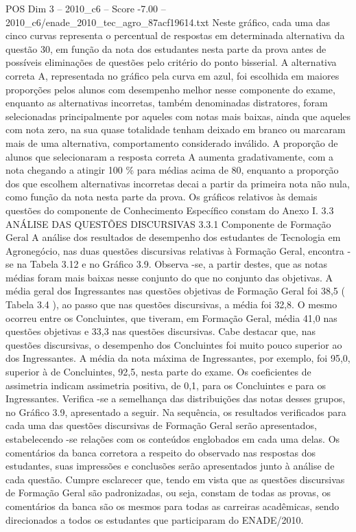 \begin{textsample}{POS Dim 3 – 2010\_c6 – Score -7.00 – 2010\_c6/enade\_2010\_tec\_agro\_87acf19614.txt}
Neste gráfico, cada uma das cinco curvas representa o percentual de respostas em determinada alternativa da questão 30, em função da nota dos estudantes nesta parte da prova antes de possíveis eliminações de questões pelo critério do ponto bisserial.
A alternativa correta A, representada no gráfico pela curva em azul, foi escolhida em maiores proporções pelos alunos com desempenho melhor nesse componente do exame, enquanto as alternativas incorretas, também denominadas distratores, foram selecionadas principalmente por aqueles com notas mais baixas, ainda que aqueles com nota zero, na sua quase totalidade tenham deixado em branco ou marcaram mais de uma alternativa, comportamento considerado inválido.
A proporção de alunos que selecionaram a resposta correta A aumenta gradativamente, com a nota chegando a atingir 100 \% para médias acima de 80, enquanto a proporção dos que escolhem alternativas incorretas decai a partir da primeira nota não nula, como função da nota nesta parte da prova.
Os gráficos relativos às demais questões do componente de Conhecimento Específico constam do Anexo I. 3.3 ANÁLISE DAS QUESTÕES DISCURSIVAS 3.3.1 Componente de Formação Geral A análise dos resultados de desempenho dos estudantes de Tecnologia em Agronegócio, nas duas questões discursivas relativas à Formação Geral, encontra -se na Tabela 3.12 e no Gráfico 3.9.
Observa -se, a partir destes, que as notas médias foram mais baixas nesse conjunto do que no conjunto das objetivas.
A média geral dos Ingressantes nas questões objetivas de Formação Geral foi 38,5 ( Tabela 3.4 ), ao passo que nas questões discursivas, a média foi 32,8.
O mesmo ocorreu entre os Concluintes, que tiveram, em Formação Geral, média 41,0 nas questões objetivas e 33,3 nas questões discursivas.
Cabe destacar que, nas questões discursivas, o desempenho dos Concluintes foi muito pouco superior ao dos Ingressantes.
A média da nota máxima de Ingressantes, por exemplo, foi 95,0, superior à de Concluintes, 92,5, nesta parte do exame.
Os coeficientes de assimetria indicam assimetria positiva, de 0,1, para os Concluintes e para os Ingressantes.
Verifica -se a semelhança das distribuições das notas desses grupos, no Gráfico 3.9, apresentado a seguir.
Na sequência, os resultados verificados para cada uma das questões discursivas de Formação Geral serão apresentados, estabelecendo -se relações com os conteúdos englobados em cada uma delas.
Os comentários da banca corretora a respeito do observado nas respostas dos estudantes, suas impressões e conclusões serão apresentados junto à análise de cada questão.
Cumpre esclarecer que, tendo em vista que as questões discursivas de Formação Geral são padronizadas, ou seja, constam de todas as provas, os comentários da banca são os mesmos para todas as carreiras acadêmicas, sendo direcionados a todos os estudantes que participaram do ENADE/2010.

\end{textsample}
